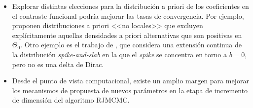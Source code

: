 \begin{itemize}
    \item Explorar distintas elecciones para la distribución a priori de los coeficientes en el contraste funcional podría mejorar las tasas de convergencia. Por ejemplo, \citet{johnson2010use} proponen distribuciones a priori <<no locales>> que excluyen explícitamente aquellas densidades a priori alternativas que son positivas en \(\Theta_0\). Otro ejemplo es el trabajo de \citet{rockova2018bayesian}, que considera una extensión continua de la distribución \textit{spike-and-slab} en la que el \textit{spike} se concentra en torno a \(b=0\), pero no es una delta de Dirac.
    \item Desde el punto de vista computacional, existe un amplio margen para mejorar los mecanismos de propuesta de nuevos parámetros en la etapa de incremento de dimensión del algoritmo \acs{RJMCMC}.
\end{itemize}
